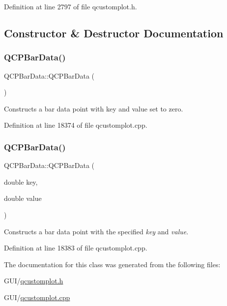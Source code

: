 Definition at line 2797 of file qcustomplot.\+h.



\subsection{Constructor \& Destructor Documentation}
\mbox{\label{class_q_c_p_bar_data_a8d214eda9ef41bc6da2a908a09623836}} 
\subsubsection{\texorpdfstring{Q\+C\+P\+Bar\+Data()}{QCPBarData()}\hspace{0.1cm}{\footnotesize\ttfamily [1/2]}}
{\footnotesize\ttfamily Q\+C\+P\+Bar\+Data\+::\+Q\+C\+P\+Bar\+Data (\begin{DoxyParamCaption}{ }\end{DoxyParamCaption})}

Constructs a bar data point with key and value set to zero. 

Definition at line 18374 of file qcustomplot.\+cpp.

\mbox{\label{class_q_c_p_bar_data_ac0bb7ede5373a7b18713418fa78f972d}} 
\subsubsection{\texorpdfstring{Q\+C\+P\+Bar\+Data()}{QCPBarData()}\hspace{0.1cm}{\footnotesize\ttfamily [2/2]}}
{\footnotesize\ttfamily Q\+C\+P\+Bar\+Data\+::\+Q\+C\+P\+Bar\+Data (\begin{DoxyParamCaption}\item[{double}]{key,  }\item[{double}]{value }\end{DoxyParamCaption})}

Constructs a bar data point with the specified {\itshape key} and {\itshape value}. 

Definition at line 18383 of file qcustomplot.\+cpp.



The documentation for this class was generated from the following files\+:\begin{DoxyCompactItemize}
\item 
G\+U\+I/\hyperlink{qcustomplot_8h}{qcustomplot.\+h}\item 
G\+U\+I/\hyperlink{qcustomplot_8cpp}{qcustomplot.\+cpp}\end{DoxyCompactItemize}
